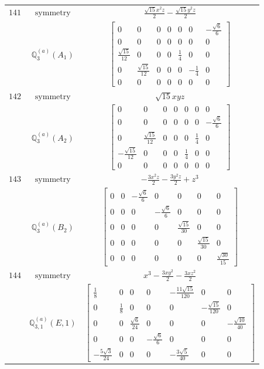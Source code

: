 \documentclass[fleqn,8pt,landscape]{jsarticle}
\begin{document}
\begin{longtable}{ccc}
$ 141 $ & $ \text{symmetry} $ & $ \frac{\sqrt{15} x^{2} z}{2} - \frac{\sqrt{15} y^{2} z}{2} $ \\
$  $ & $ \mathbb{Q}_{3}^{(a)}(A_{1}) $ & $ \begin{bmatrix} 0 & 0 & 0 & 0 & 0 & 0 & - \frac{\sqrt{6}}{6} \\ 0 & 0 & 0 & 0 & 0 & 0 & 0 \\ \frac{\sqrt{15}}{12} & 0 & 0 & 0 & \frac{1}{4} & 0 & 0 \\ 0 & \frac{\sqrt{15}}{12} & 0 & 0 & 0 & - \frac{1}{4} & 0 \\ 0 & 0 & 0 & 0 & 0 & 0 & 0 \end{bmatrix} $ \\ \hline
$ 142 $ & $ \text{symmetry} $ & $ \sqrt{15} x y z $ \\
$  $ & $ \mathbb{Q}_{3}^{(a)}(A_{2}) $ & $ \begin{bmatrix} 0 & 0 & 0 & 0 & 0 & 0 & 0 \\ 0 & 0 & 0 & 0 & 0 & 0 & - \frac{\sqrt{6}}{6} \\ 0 & \frac{\sqrt{15}}{12} & 0 & 0 & 0 & \frac{1}{4} & 0 \\ - \frac{\sqrt{15}}{12} & 0 & 0 & 0 & \frac{1}{4} & 0 & 0 \\ 0 & 0 & 0 & 0 & 0 & 0 & 0 \end{bmatrix} $ \\ \hline
$ 143 $ & $ \text{symmetry} $ & $ - \frac{3 x^{2} z}{2} - \frac{3 y^{2} z}{2} + z^{3} $ \\
$  $ & $ \mathbb{Q}_{3}^{(a)}(B_{2}) $ & $ \begin{bmatrix} 0 & 0 & - \frac{\sqrt{6}}{6} & 0 & 0 & 0 & 0 \\ 0 & 0 & 0 & - \frac{\sqrt{6}}{6} & 0 & 0 & 0 \\ 0 & 0 & 0 & 0 & \frac{\sqrt{15}}{30} & 0 & 0 \\ 0 & 0 & 0 & 0 & 0 & \frac{\sqrt{15}}{30} & 0 \\ 0 & 0 & 0 & 0 & 0 & 0 & \frac{\sqrt{30}}{15} \end{bmatrix} $ \\ \hline
$ 144 $ & $ \text{symmetry} $ & $ x^{3} - \frac{3 x y^{2}}{2} - \frac{3 x z^{2}}{2} $ \\
$  $ & $ \mathbb{Q}_{3,1}^{(a)}(E,1) $ & $ \begin{bmatrix} \frac{1}{8} & 0 & 0 & 0 & - \frac{11 \sqrt{15}}{120} & 0 & 0 \\ 0 & \frac{1}{8} & 0 & 0 & 0 & - \frac{\sqrt{15}}{120} & 0 \\ 0 & 0 & \frac{\sqrt{6}}{24} & 0 & 0 & 0 & - \frac{\sqrt{10}}{40} \\ 0 & 0 & 0 & - \frac{\sqrt{6}}{6} & 0 & 0 & 0 \\ - \frac{5 \sqrt{3}}{24} & 0 & 0 & 0 & - \frac{3 \sqrt{5}}{40} & 0 & 0 \end{bmatrix} $ \\ \hline

\end{longtable}
\end{document}
